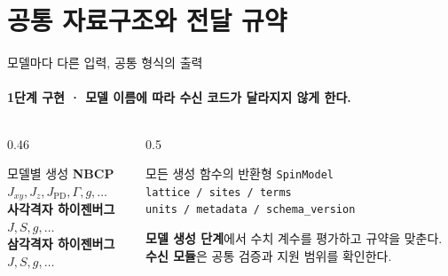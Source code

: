 \section[공통 자료구조와 전달 규약]{공통 자료구조와 전달 규약}

\begin{frame}[plain,label=section-contract]
  \sectionpage
\end{frame}

\begin{frame}[label=common-interface]{모델마다 다른 입력, 공통 형식의 출력}
  \framesubtitle{1단계 구현 · 모델 이름에 따라 수신 코드가 달라지지 않게 한다.}
  \begin{columns}[T,onlytextwidth]
    \begin{column}{0.46\textwidth}
      \begin{block}{모델별 생성}
        \textbf{NBCP}\\
        $J_{xy},J_z,J_{\mathrm{PD}},\Gamma,g,\ldots$\\[0.7em]
        \textbf{사각격자 하이젠버그}\\
        $J,S,g,\ldots$\\[0.7em]
        \textbf{삼각격자 하이젠버그}\\
        $J,S,g,\ldots$
      \end{block}
    \end{column}
    \begin{column}{0.5\textwidth}
      \begin{block}{모든 생성 함수의 반환형}
        \texttt{SpinModel}\\[0.6em]
        \texttt{lattice / sites / terms}\\
        \texttt{units / metadata / schema\_version}
      \end{block}
      \medskip
      \textbf{모델 생성 단계}에서 수치 계수를 평가하고 규약을 맞춘다.\\[0.5em]
      \textbf{수신 모듈}은 공통 검증과 지원 범위를 확인한다.
    \end{column}
  \end{columns}
  \medskip
\end{frame}

